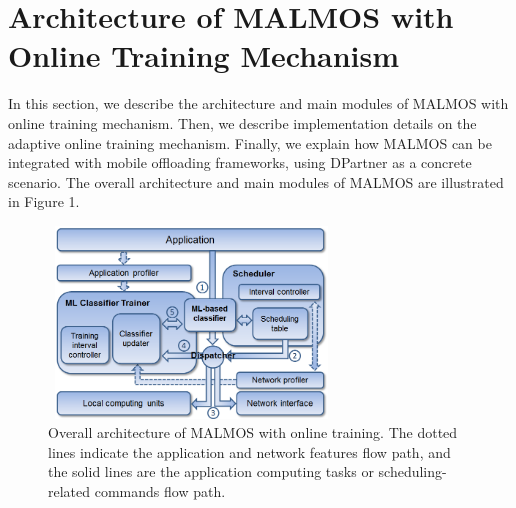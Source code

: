 \documentclass[10pt, conference, compsocconf]{IEEEtran}
\begin{document}
\section{Architecture of MALMOS with Online Training Mechanism}
%
In this section, we describe the architecture and main modules of MALMOS
with online training mechanism.
%
Then, we describe implementation details on the adaptive online training
mechanism.
%
Finally, we explain how MALMOS can be integrated with mobile offloading
frameworks, using DPartner as a concrete scenario.
%
The overall architecture and main modules of MALMOS are illustrated in
Figure 1.
%
\begin{figure}
\centering
\includegraphics[height=5.1cm, width=7.6cm]{Figure/figure1}
\caption{Overall architecture of MALMOS with online training. The dotted
lines indicate the application and network features flow path, and the
solid lines are the application computing tasks or scheduling-related
commands flow path.}
\end{figure}
%
\end{document}
